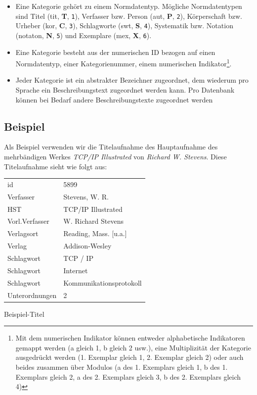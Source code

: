 \documentclass[11pt, twoside, a4paper, BCOR8mm, DIV12, bibtotoc,idxtotoc]{scrbook}
\begin{document}
\begin{itemize}
\item Eine Kategorie gehört zu einem Normdatentyp. Mögliche
  Normdatentypen sind Titel (tit, \textbf{T}, \texttt{1}), Verfasser
  bzw. Person (aut, \textbf{P}, \texttt{2}), Körperschaft bzw. Urheber
  (kor, \textbf{C}, \texttt{3}), Schlagworte (swt, \textbf{S},
  \texttt{4}), Systematik bzw. Notation (notaton, \textbf{N},
  \texttt{5}) und Exemplare (mex, \textbf{X}, \texttt{6}).
\item Eine Kategorie besteht aus der numerischen ID bezogen auf einen
  Normdatentyp, einer Kategorienummer, einem numerischen
  Indikator\footnote{Mit dem numerischen Indikator können entweder
    alphabetische Indikatoren gemappt werden (a gleich 1, b gleich 2
    usw.), eine Multiplizität der Kategorie ausgedrückt werden (1.
    Exemplar gleich 1, 2. Exemplar gleich 2) oder auch beides zusammen
    über Modulos (a des 1. Exemplars gleich 1, b des 1. Exemplars
    gleich 2, a des 2. Exemplars gleich 3, b des 2. Exemplars gleich
    4)}.
\item Jeder Kategorie ist ein abstrakter Bezeichner zugeordnet, dem
  wiederum pro Sprache ein Beschreibungstext zugeordnet werden
  kann. Pro Datenbank können bei Bedarf andere Beschreibungstexte
  zugeordnet werden
\end{itemize}


\subsection{Beispiel}

Als Beispiel verwenden wir die Titelaufnahme des Hauptaufnahme des
mehrbändigen Werkes \emph{TCP/IP Illustrated} von \emph{Richard
  W. Stevens}. Diese Titelaufnahme sieht wie folgt aus:

\begin{shadowenv}
\vspace{0.5cm}
\begin{center}
  \begin{tabular}{ll}
id	        & 5899\\
Verfasser	& Stevens, W. R.\\
HST	        & TCP/IP Illustrated\\
Vorl.Verfasser	& W. Richard Stevens\\
Verlagsort	& Reading, Mass. [u.a.]\\
Verlag	        & Addison-Wesley\\
Schlagwort	& TCP / IP\\
Schlagwort	& Internet\\
Schlagwort	& Kommunikationsprotokoll\\
Unterordnungen	& 2\\
  \end{tabular}
\end{center}
  \caption{Beispiel-Titel}
\vspace{0.5cm}
\end{shadowenv}
\end{document}
